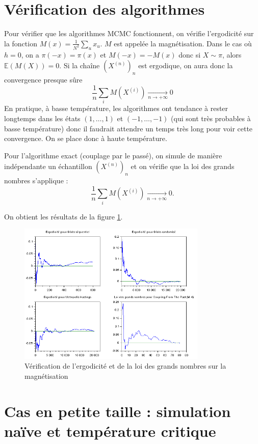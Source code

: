 \documentclass[a4paper,11pt]{article}
\begin{document}
\section{Vérification des algorithmes}\label{sec:check}

Pour vérifier que les algorithmes MCMC fonctionnent, on vérifie l'ergodicité sur la fonction $M(x) = \frac{1}{N^2} \sum_u x_u$. $M$ est appelée la magnétisation. Dans le cas où $h = 0$, on a $\pi(-x) = \pi(x)$ et $M(-x) = -M(x)$ donc si $X \sim \pi$, alors $\mathbb E(M(X)) = 0$. Si la chaîne $(X^{(n)})_n$ est ergodique, on aura donc la convergence presque sûre
$$\frac{1}{n} \sum_i M(X^{(i)}) \xrightarrow[n \rightarrow +\infty]{} 0$$
En pratique, à basse température, les algorithmes ont tendance à rester longtemps dans les états $(1,\hdots,1)$ et $(-1,\hdots,-1)$ (qui sont très probables à basse température) donc il faudrait attendre un temps très long pour voir cette convergence. On se place donc à haute température.

Pour l'algorithme exact (couplage par le passé), on simule de manière indépendante un échantillon $(X^{(n)})_n$ et on vérifie que la loi des grands nombres s'applique :
$$\frac{1}{n} \sum_i M(X^{(i)}) \xrightarrow[n \rightarrow +\infty]{} 0.$$

On obtient les résultats de la figure \ref{fig:ergodic}.
\begin{figure}[!htbp]
	\label{fig:ergodic}
	\includegraphics[width=0.8\textwidth]{ergodicite_magnetisation.png}
	\caption{Vérification de l'ergodicité et de la loi des grands nombres sur la magnétisation}
\end{figure}

\section{Cas en petite taille : simulation naïve et température critique}\label{sec:naive}
\end{document}

